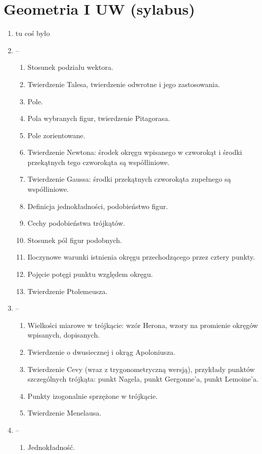 \documentclass{parchment}
\begin{document}
\section{Geometria I UW (sylabus)}
\begin{enumerate}
	\item tu coś było
	\item -- \begin{enumerate}
		\item Stosunek podziału wektora.
		\item Twierdzenie Talesa, twierdzenie odwrotne i jego zastosowania.
		\item Pole.
		\item Pola wybranych figur, twierdzenie Pitagorasa.
		\item Pole zorientowane.
		\item Twierdzenie Newtona: środek okręgu wpisanego w czworokąt i środki przekątnych tego czworokąta są współliniowe.
		\item Twierdzenie Gaussa: środki przekątnych czworokąta zupełnego są współliniowe.
		\item Definicja jednokładności, podobieństwo figur.
		\item Cechy podobieństwa trójkątów.
		\item Stosunek pól figur podobnych.
		\item Iloczynowe warunki istnienia okręgu przechodzącego przez cztery punkty.
		\item Pojęcie potęgi punktu względem okręgu.
		\item Twierdzenie Ptolemeusza.
	\end{enumerate}
	\item -- \begin{enumerate}
		\item Wielkości miarowe w trójkącie: wzór Herona, wzory na promienie okręgów wpisanych, dopisanych.
		\item Twierdzenie o dwusiecznej i okrąg Apoloniusza.
		\item Twierdzenie Cevy (wraz z trygonometryczną wersją), przykłady punktów szczególnych trójkąta: punkt Nagela, punkt Gergonne'a, punkt Lemoine'a.
		\item Punkty izogonalnie sprzężone w trójkącie.
		\item Twierdzenie Menelausa.
	\end{enumerate}
	\item -- \begin{enumerate}
		\item Jednokładność.

\end{enumerate}
\end{enumerate}
\end{document}
